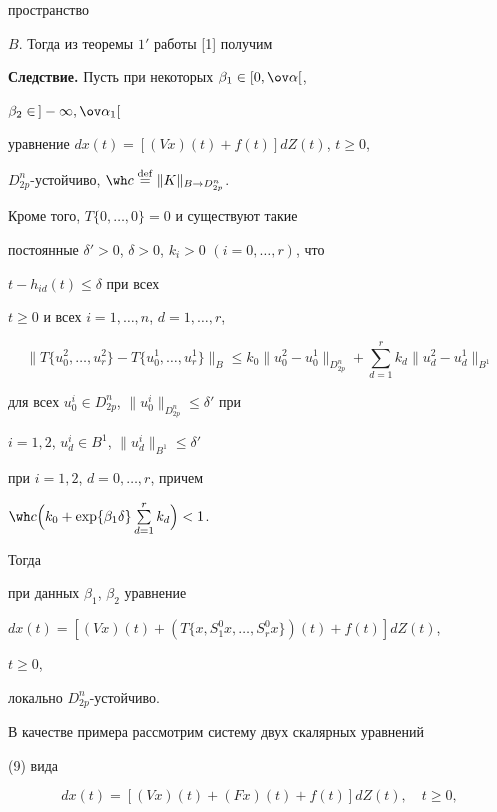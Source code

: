 пространство 


$B$. Тогда из теоремы $1'$ работы [1] получим 


\medskip 


 


{\bf Следствие.} Пусть при некоторых $\beta_1\in[0,\ov\alpha[$, 


$\beta_2\in\,]-\infty,\ov\alpha_1[$ 


уравнение $d{}x(t)=[(V{}x)(t)+f(t)]d{}Z(t)$, $t\ge0$, 


$D^n_{2p}$-устойчиво, $\wh c\eqdef\|K\|_{B\to D^n_{2p}}$. 


Кроме того, $T\{0,\dotsc,0\}=0$ и существуют такие 


постоянные $\delta'>0$, $\delta>0$, $k_i>0$ $(i=0,\dotsc,r)$, что 


$t-h_{id}(t)\le\delta$ при всех 


$t\ge0$ и всех $i=1,\dotsc,n$, $d=1,\dotsc,r$, 


$$ 


\|T\{u^2_0,\dotsc,u^2_r\}-T\{u^1_0,\dotsc,u^1_r\}\|_B\le 


k_0\|u^2_0-u^1_0\|_{D^n_{2p}}+\sum^r_{d=1} 


k_d\|u^2_d-u^1_d\|_{B^1}


$$ 


для всех $u^i_0\in D^n_{2p}$, $\|u^i_0\|_{D^n_{2p}}\le\delta'$ при 


$i=1,2$, $u^i_d\in B^1$, $\|u^i_d\|_{B^1}\le\delta'$ 


при $i=1,2$, $d=0,\dotsc,r$, причем 


$\wh c\Big(k_0+\exp\{\beta_1\delta\}\sum\limits^r_{d=1}k_d\Big)<1$. 


Тогда 


при данных $\beta_1$, $\beta_2$ уравнение 


$d x(t)=[(V x)(t)+(T\{x,S^0_1x,\dotsc,S^0_r x\})(t)+ f(t)]d Z(t)$, 


$t\ge0$, 


локально $D^n_{2p}$-устойчиво. 


\medskip 


 


В качестве примера рассмотрим систему двух скалярных уравнений 


(9) вида 


\begin{equation} 


d x(t)=[(V x)(t)+(F x)(t)+f(t)]d Z(t),\quad t\ge0, 


\end{equation} 


